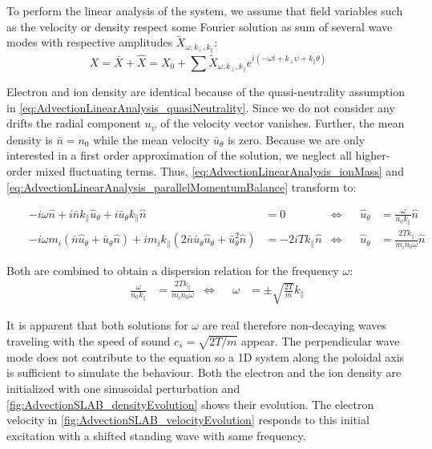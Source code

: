 To perform the linear analysis of the system, we assume that field variables such as the velocity or density respect some Fourier solution as sum of several wave modes with respective amplitudes $\tilde{X}_{\omega,k_\perp,k_\parallel}$:
\begin{equation}
	 X = \bar{X} + \hat{X} = X_0 + \sum\tilde{X}_{\omega,k_\perp,k_\parallel}e^{i(-\omega t + k_\perp \psi + k_\parallel \theta)} \label{eq:FourierModeSolution}
\end{equation}

Electron and ion density are identical because of the quasi-neutrality assumption in \autoref{eq:AdvectionLinearAnalysis_quasiNeutrality}. Since we do not consider any drifts the radial component $u_\psi$ of the velocity vector vanishes. Further, the mean density is $\bar{n}=n_0$ while the mean velocity $\bar{u}_\theta$ is zero. Because we are only interested in a first order approximation of the solution, we neglect all higher-order mixed fluctuating terms. Thus, \autoref{eq:AdvectionLinearAnalysis_ionMass} and \autoref{eq:AdvectionLinearAnalysis_parallelMomentumBalance} transform to:

\begin{align*}
	&&-i\omega\hat{n} + i\bar{n}k_\parallel\hat{u}_\theta + i\bar{u}_\theta k_\parallel\hat{n} &= 0 &\Leftrightarrow&& \hat{u}_\theta &= \frac{\omega}{n_0k_\parallel}\hat{n} \\
	&& -i\omega m_i \left(\bar{n}\hat{u}_\theta + \bar{u}_\theta\hat{n}\right) + im_ik_\parallel\left(2\bar{n}\bar{u}_\theta\hat{u}_\theta + \bar{u}_\theta^2\hat{n}\right) &= -2iT k_\parallel\hat{n}	&\Leftrightarrow&&  \hat{u}_\theta &= \frac{2T k_\parallel}{m_in_0\omega}\hat{n}
\end{align*}

Both are combined to obtain a dispersion relation for the frequency $\omega$:
\begin{align}
	&& \frac{\omega}{n_0k_\parallel} &= \frac{2T k_\parallel}{m_in_0\omega} 
	&\Leftrightarrow&& \omega &= \pm\sqrt{\frac{2T}{m}}k_\parallel \label{eq:AdvectionLinearAnalysis_dispersionRelation}
\end{align}

It is apparent that both solutions for $\omega$ are real therefore non-decaying waves traveling with the speed of sound $c_s = \sqrt{2T/m}$ appear. The perpendicular wave mode does not contribute to the equation so a 1D system along the poloidal axis is sufficient to simulate the behaviour. Both the electron and the ion density are initialized with one sinusoidal perturbation and \autoref{fig:AdvectionSLAB_densityEvolution} shows their evolution. The electron velocity in \autoref{fig:AdvectionSLAB_velocityEvolution} responds to this initial excitation with a shifted standing wave with same frequency. 

